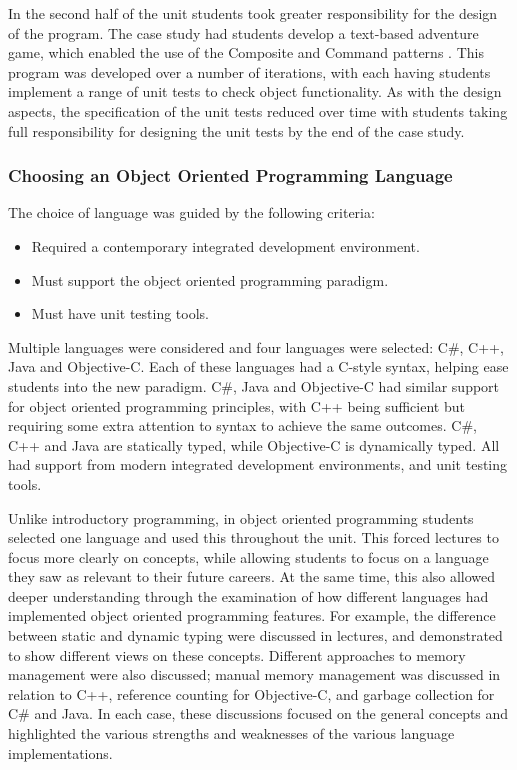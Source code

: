 In the second half of the unit students took greater responsibility for the design of the program. The case study had students develop a text-based adventure game, which enabled the use of the Composite and Command patterns \cite{Gamma:2001}. This program was developed over a number of iterations, with each having students implement a range of unit tests to check object functionality. As with the design aspects, the specification of the unit tests reduced over time with students taking full responsibility for designing the unit tests by the end of the case study.

\subsubsection{Choosing an Object Oriented Programming Language} %
\label{ssub:choosing_an_object_oriented_programming_language}

The choice of language was guided by the following criteria:

\begin{itemize}[noitemsep,nolistsep]
	\item Required a contemporary integrated development environment.
	\item Must support the object oriented programming paradigm.
	\item Must have unit testing tools.
\end{itemize}

Multiple languages were considered and four languages were selected: C\#, C++, Java and Objective-C. Each of these languages had a C-style syntax, helping ease students into the new paradigm. C\#, Java and Objective-C had similar support for object oriented programming principles, with C++ being sufficient but requiring some extra attention to syntax to achieve the same outcomes. C\#, C++ and Java are statically typed, while Objective-C is dynamically typed. All had support from modern integrated development environments, and unit testing tools.

Unlike introductory programming, in object oriented programming students selected one language and used this throughout the unit. This forced lectures to focus more clearly on concepts, while allowing students to focus on a language they saw as relevant to their future careers. At the same time, this also allowed deeper understanding through the examination of how different languages had implemented object oriented programming features. For example, the difference between static and dynamic typing were discussed in lectures, and demonstrated to show different views on these concepts. Different approaches to memory management were also discussed; manual memory management was discussed in relation to C++, reference counting for Objective-C, and garbage collection for C\# and Java. In each case, these discussions focused on the general concepts and highlighted the various strengths and weaknesses of the various language implementations.

